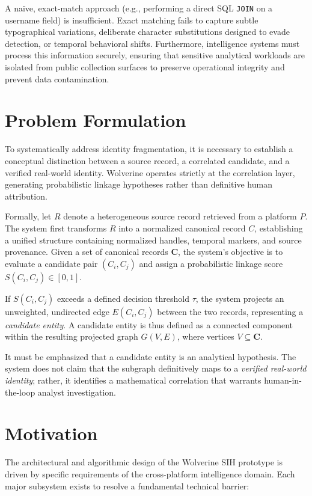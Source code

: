 A naïve, exact-match approach (e.g., performing a direct SQL \texttt{JOIN} on a username field) is insufficient. Exact matching fails to capture subtle typographical variations, deliberate character substitutions designed to evade detection, or temporal behavioral shifts. Furthermore, intelligence systems must process this information securely, ensuring that sensitive analytical workloads are isolated from public collection surfaces to preserve operational integrity and prevent data contamination.

\section{Problem Formulation}
\label{sec:intro-problem-formulation}
To systematically address identity fragmentation, it is necessary to establish a conceptual distinction between a source record, a correlated candidate, and a verified real-world identity. Wolverine operates strictly at the correlation layer, generating probabilistic linkage hypotheses rather than definitive human attribution.

Formally, let $R$ denote a heterogeneous source record retrieved from a platform $P$. The system first transforms $R$ into a normalized canonical record $C$, establishing a unified structure containing normalized handles, temporal markers, and source provenance. Given a set of canonical records $\mathbf{C}$, the system's objective is to evaluate a candidate pair $(C_i, C_j)$ and assign a probabilistic linkage score $S(C_i, C_j) \in [0, 1]$. 

If $S(C_i, C_j)$ exceeds a defined decision threshold $\tau$, the system projects an unweighted, undirected edge $E(C_i, C_j)$ between the two records, representing a \textit{candidate entity}. A candidate entity is thus defined as a connected component within the resulting projected graph $G(V, E)$, where vertices $V \subseteq \mathbf{C}$. 

It must be emphasized that a candidate entity is an analytical hypothesis. The system does not claim that the subgraph definitively maps to a \textit{verified real-world identity}; rather, it identifies a mathematical correlation that warrants human-in-the-loop analyst investigation. 

\section{Motivation}
\label{sec:intro-motivation}
The architectural and algorithmic design of the Wolverine SIH prototype is driven by specific requirements of the cross-platform intelligence domain. Each major subsystem exists to resolve a fundamental technical barrier:

